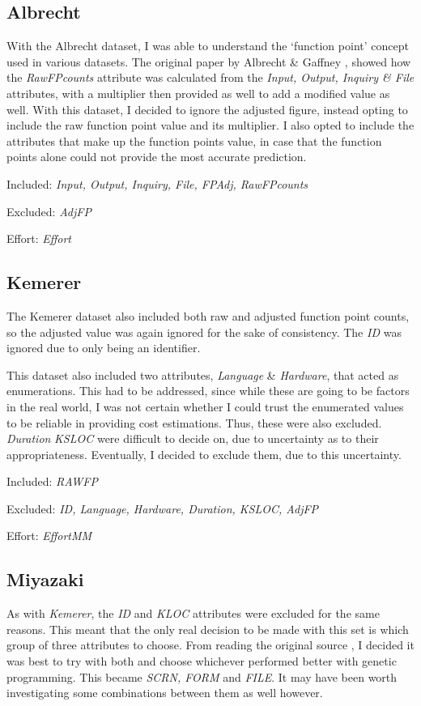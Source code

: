 \documentclass[11pt, a4paper]{article}
\begin{document}
\subsection{Albrecht} %
\label{sub:albrecht}
With the Albrecht dataset, I was able to understand the `function point' concept
used in various datasets. The original paper by Albrecht \& Gaffney
\cite{1703110}, showed how the \emph{RawFPcounts} attribute was calculated
from the \emph{Input, Output, Inquiry \& File} attributes, with a multiplier
then provided as well to add a modified value as well. With this dataset, I
decided to ignore the adjusted figure, instead opting to include the raw
function point value and its multiplier. I also opted to include the attributes
that make up the function points value, in case that the function points alone
could not provide the most accurate prediction.

Included: \emph{Input, Output, Inquiry, File, FPAdj, RawFPcounts}

Excluded: \emph{AdjFP}

Effort: \emph{Effort}

\subsection{Kemerer} %
\label{sub:kemerer}
The Kemerer dataset also included both raw and adjusted function point counts,
so the adjusted value was again ignored for the sake of consistency. The
\emph{ID} was ignored due to only being an identifier.

This dataset also included two attributes, \emph{Language} \& \emph{Hardware},
that acted as enumerations. This had to be addressed, since while these are going
to be factors in the real world, I was not certain whether I could trust the
enumerated values to be reliable in providing cost estimations. Thus, these were
also excluded. \emph{Duration} \emph{KSLOC} were difficult to decide on, due to
uncertainty as to their appropriateness. Eventually, I decided to exclude them,
due to this uncertainty.

Included: \emph{RAWFP}

Excluded: \emph{ID, Language, Hardware, Duration, KSLOC, AdjFP}

Effort: \emph{EffortMM}

\subsection{Miyazaki} %
\label{sub:miyazaki}
As with \emph{Kemerer}, the \emph{ID} and \emph{KLOC} attributes were excluded
for the same reasons. This meant that the only real decision to be made with
this set is which group of three attributes to choose. From reading the original
source \cite[Section~4.2]{MIYAZAKI19943}, I decided it was best to try with both
and choose whichever performed better with genetic programming. This became
\emph{SCRN, FORM} and \emph{FILE}. It may have been worth investigating some
combinations between them as well however.
\end{document}
